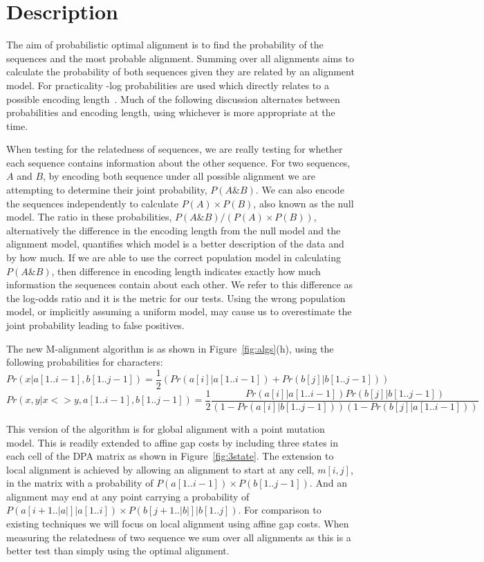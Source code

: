 \documentclass[letterpaper,11pt,oneside]{article}
\begin{document}
\section{Description}

The aim of probabilistic optimal alignment is to find the probability of the
sequences and the most probable alignment.  Summing over all alignments aims
to calculate the probability of both sequences given they are related by an
alignment model.  For practicality -log probabilities are used which directly
relates to a possible encoding length~\cite{shannon48}.  Much of the following
discussion alternates between probabilities and encoding length, using
whichever is more appropriate at the time.

When testing for the relatedness of sequences, we are really testing for
whether each sequence contains information about the other sequence.  For two
sequences, $A$ and $B$, by encoding both sequence under all possible alignment
we are attempting to determine their joint probability, $P(A \& B)$.  We can
also encode the sequences independently to calculate $P(A) \times P(B)$, also known
as the null model.  The ratio in these probabilities, $P(A \& B) / (P(A) \times
P(B))$, alternatively the difference in the encoding length from the null model
and the alignment model, quantifies which model is a better description of the
data and by how much.  If we are able to use the correct population model in
calculating $P(A\&B)$, then difference in encoding length indicates exactly how
much information the sequences contain about each other.  We refer to this
difference as the log-odds ratio and it is the metric for our tests. Using the
wrong population model, or implicitly assuming a uniform model, may cause us
to overestimate the joint probability leading to false positives.

The new M-alignment algorithm is as shown in Figure~\ref{fig:algs}(h), using
the following probabilities for characters:
$$Pr(x|a[1..i-1],b[1..j-1]) = \frac{1}{2} ( Pr(a[i]|a[1..i-1]) +
Pr(b[j]|b[1..j-1]) )$$
$$Pr(x,y|x<>y,a[1..i-1],b[1..j-1]) = \frac{1}{2}\frac{Pr(a[i]|a[1..i-1])
Pr(b[j]|b[1..j-1])}{(1-Pr(a[i]|b[1..j-1]))(1-Pr(b[j]|a[1..i-1]))}$$

This version of the algorithm is for global alignment with a point mutation
model.  This is readily extended to affine gap costs by including three states
in each cell of the DPA matrix as shown in Figure~\ref{fig:3state}.  The
extension to local alignment is achieved by allowing an alignment to start at
any cell, $m[i,j]$, in the matrix with a probability of $P(a[1..i-1]) \times
P(b[1..j-1])$.  And an alignment may end at any point carrying a probability
of $P(a[i+1..|a|] | a[1..i]) \times P(b[j+1..|b|] | b[1..j])$.  For comparison
to existing techniques we will focus on local alignment using affine gap
costs.  When measuring the relatedness of two sequence we sum over all
alignments as this is a better test than simply using the optimal alignment.
\end{document}
